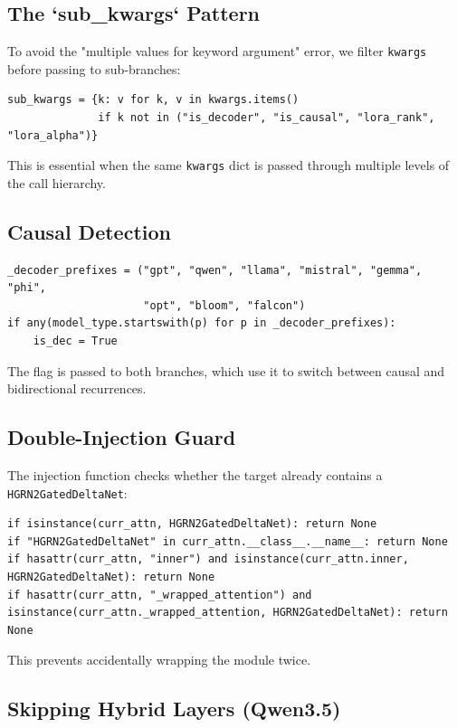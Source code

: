 \subsection{The `sub\_kwargs` Pattern}

To avoid the "multiple values for keyword argument" error, we filter 
\texttt{kwargs} before passing to sub-branches:

\begin{lstlisting}
sub_kwargs = {k: v for k, v in kwargs.items() 
              if k not in ("is_decoder", "is_causal", "lora_rank", "lora_alpha")}
\end{lstlisting}

This is essential when the same \texttt{kwargs} dict is passed through multiple 
levels of the call hierarchy.

\subsection{Causal Detection}

\begin{lstlisting}
_decoder_prefixes = ("gpt", "qwen", "llama", "mistral", "gemma", "phi", 
                     "opt", "bloom", "falcon")
if any(model_type.startswith(p) for p in _decoder_prefixes):
    is_dec = True
\end{lstlisting}

The flag is passed to both branches, which use it to switch between 
causal and bidirectional recurrences.

\subsection{Double-Injection Guard}

The injection function checks whether the target already contains a 
\texttt{HGRN2GatedDeltaNet}:

\begin{lstlisting}
if isinstance(curr_attn, HGRN2GatedDeltaNet): return None
if "HGRN2GatedDeltaNet" in curr_attn.__class__.__name__: return None
if hasattr(curr_attn, "inner") and isinstance(curr_attn.inner, HGRN2GatedDeltaNet): return None
if hasattr(curr_attn, "_wrapped_attention") and isinstance(curr_attn._wrapped_attention, HGRN2GatedDeltaNet): return None
\end{lstlisting}

This prevents accidentally wrapping the module twice.

\subsection{Skipping Hybrid Layers (Qwen3.5)}

